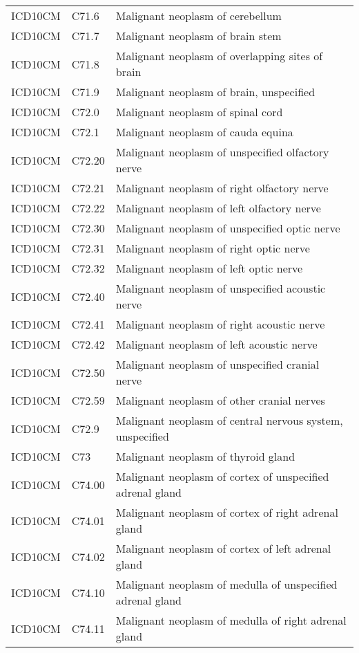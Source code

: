 \begin{longtable}{p{}p{}p{}}
  ICD10CM & C71.6 & Malignant neoplasm of cerebellum \\ 
  ICD10CM & C71.7 & Malignant neoplasm of brain stem \\ 
  ICD10CM & C71.8 & Malignant neoplasm of overlapping sites of brain \\ 
  ICD10CM & C71.9 & Malignant neoplasm of brain, unspecified \\ 
  ICD10CM & C72.0 & Malignant neoplasm of spinal cord \\ 
  ICD10CM & C72.1 & Malignant neoplasm of cauda equina \\ 
  ICD10CM & C72.20 & Malignant neoplasm of unspecified olfactory nerve \\ 
  ICD10CM & C72.21 & Malignant neoplasm of right olfactory nerve \\ 
  ICD10CM & C72.22 & Malignant neoplasm of left olfactory nerve \\ 
  ICD10CM & C72.30 & Malignant neoplasm of unspecified optic nerve \\ 
  ICD10CM & C72.31 & Malignant neoplasm of right optic nerve \\ 
  ICD10CM & C72.32 & Malignant neoplasm of left optic nerve \\ 
  ICD10CM & C72.40 & Malignant neoplasm of unspecified acoustic nerve \\ 
  ICD10CM & C72.41 & Malignant neoplasm of right acoustic nerve \\ 
  ICD10CM & C72.42 & Malignant neoplasm of left acoustic nerve \\ 
  ICD10CM & C72.50 & Malignant neoplasm of unspecified cranial nerve \\ 
  ICD10CM & C72.59 & Malignant neoplasm of other cranial nerves \\ 
  ICD10CM & C72.9 & Malignant neoplasm of central nervous system, unspecified \\ 
  ICD10CM & C73 & Malignant neoplasm of thyroid gland \\ 
  ICD10CM & C74.00 & Malignant neoplasm of cortex of unspecified adrenal gland \\ 
  ICD10CM & C74.01 & Malignant neoplasm of cortex of right adrenal gland \\ 
  ICD10CM & C74.02 & Malignant neoplasm of cortex of left adrenal gland \\ 
  ICD10CM & C74.10 & Malignant neoplasm of medulla of unspecified adrenal gland \\ 
  ICD10CM & C74.11 & Malignant neoplasm of medulla of right adrenal gland \\ 

\end{longtable}
